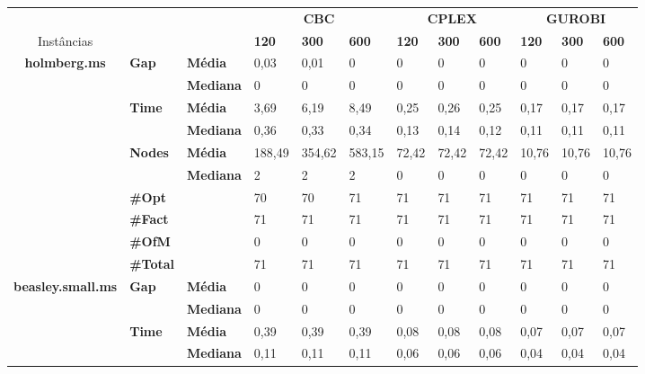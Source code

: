 \documentclass[]{article}
\begin{document}
	
	\begin{table}[]
		\begin{adjustbox}{angle=90}
			\begin{tabular}{cll|lll|lll|lll}
				& & & \multicolumn{3}{c}{\textbf{CBC}} & \multicolumn{3}{c}{\textbf{CPLEX}} & \multicolumn{3}{c}{\textbf{GUROBI}} 	\\Instâncias & & & \textbf{120} & \textbf{300} & \textbf{600} & \textbf{120} & \textbf{300} & \textbf{600} & \textbf{120} & \textbf{300} & \textbf{600} \\
				\hline
				\multirow{7}{*}{\textbf{holmberg.ms}} & \multirow{2}{*}{\textbf{Gap}} & \textbf{Média} & 0,03 & 0,01 & 0 & 0 & 0 & 0 & 0 & 0 & 0 \\
				& & \textbf{Mediana} & 0 & 0 & 0 & 0 & 0 & 0 & 0 & 0 & 0 \\
				\cline{2-12}
				& \multirow{2}{*}{\textbf{Time}} & \textbf{Média} & 3,69 & 6,19 & 8,49 & 0,25 & 0,26 & 0,25 & 0,17 & 0,17 & 0,17 \\
				& & \textbf{Mediana} & 0,36 & 0,33 & 0,34 & 0,13 & 0,14 & 0,12 & 0,11 & 0,11 & 0,11 \\
				\cline{2-12}
				& \multirow{2}{*}{\textbf{Nodes}} & \textbf{Média} & 188,49 & 354,62 & 583,15 & 72,42 & 72,42 & 72,42 & 10,76 & 10,76 & 10,76 \\
				& & \textbf{Mediana} & 2 & 2 & 2 & 0 & 0 & 0 & 0 & 0 & 0 \\
				\cline{2-12}
				& \textbf{\#Opt} & & 70 & 70 & 71 & 71 & 71 & 71 & 71 & 71 & 71 \\
				& \textbf{\#Fact} & & 71 & 71 & 71 & 71 & 71 & 71 & 71 & 71 & 71 \\
				& \textbf{\#OfM} & & 0 & 0 & 0 & 0 & 0 & 0 & 0 & 0 & 0 \\
				& \textbf{\#Total} & & 71 & 71 & 71 & 71 & 71 & 71 & 71 & 71 & 71 \\
				\hline
				\multirow{7}{*}{\textbf{beasley.small.ms}} & \multirow{2}{*}{\textbf{Gap}} & \textbf{Média} & 0 & 0 & 0 & 0 & 0 & 0 & 0 & 0 & 0 \\
				& & \textbf{Mediana} & 0 & 0 & 0 & 0 & 0 & 0 & 0 & 0 & 0 \\
				\cline{2-12}
				& \multirow{2}{*}{\textbf{Time}} & \textbf{Média} & 0,39 & 0,39 & 0,39 & 0,08 & 0,08 & 0,08 & 0,07 & 0,07 & 0,07 \\
				& & \textbf{Mediana} & 0,11 & 0,11 & 0,11 & 0,06 & 0,06 & 0,06 & 0,04 & 0,04 & 0,04 \\

\end{tabular}
\end{adjustbox}
\end{table}
\end{document}
